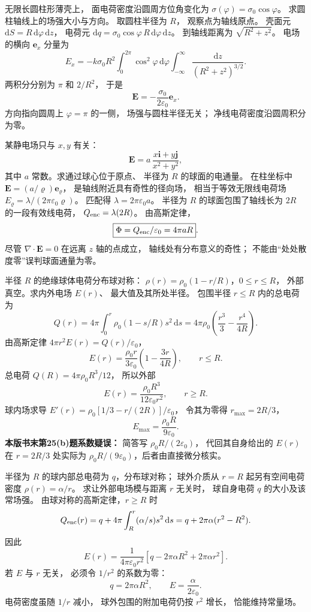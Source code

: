 无限长圆柱形薄壳上，
面电荷密度沿圆周方位角变化为
$\sigma(\varphi)=\sigma_0\cos\varphi$。
求圆柱轴线上的场强大小与方向。
\exsolution
取圆柱半径为 $R$，
观察点为轴线原点。
壳面元
$\mathrm dS=R\,\mathrm d\varphi\,\mathrm dz$，
电荷元
$\mathrm dq=\sigma_0\cos\varphi\,
R\,\mathrm d\varphi\,\mathrm dz$。
到轴线距离为
$\sqrt{R^2+z^2}$。
电场的横向 $\bm e_x$ 分量为
\[
E_x=-k\sigma_0 R^2
\int_0^{2\pi}\cos^2\varphi\,\mathrm d\varphi
\int_{-\infty}^{\infty}
\frac{\mathrm dz}{(R^2+z^2)^{3/2}}.
\]
两积分分别为 $\pi$ 和 $2/R^2$，
于是
\[
\boxed{\bm E=-\frac{\sigma_0}{2\varepsilon_0}\bm e_x}.
\]
\excheck 方向指向圆周上 $\varphi=\pi$ 的一侧，
场强与圆柱半径无关；
净线电荷密度沿圆周积分为零。

某静电场只与 $x,y$ 有关：
\[
\bm E=a\,\frac{x\bm i+y\bm j}{x^2+y^2},
\]
其中 $a$ 常数。求通过球心位于原点、
半径为 $R$ 的球面的电通量。
\exsolution
在柱坐标中
$\bm E=(a/\varrho)\bm e_\varrho$，
是轴线附近具有奇性的径向场，
相当于等效无限线电荷场
$E_\varrho=\lambda/(2\pi\varepsilon_0\varrho)$。
匹配得 $\lambda=2\pi\varepsilon_0a$。
半径为 $R$ 的球面包围了轴线长为 $2R$
的一段有效线电荷，
$Q_{\rm enc}=\lambda(2R)$。
由高斯定律，
\[
\boxed{\Phi=Q_{\rm enc}/\varepsilon_0=4\pi aR}.
\]
\excheck 尽管 $\nabla\cdot\bm E=0$
在远离 $z$ 轴的点成立，
轴线处有分布意义的奇性；
不能由“处处散度零”误判球面通量为零。

半径 $R$ 的绝缘球体电荷分布球对称：
$\rho(r)=\rho_0(1-r/R)$，$0\le r\le R$，
外部真空。求内外电场 $E(r)$、
最大值及其所处半径。
\exsolution
包围半径 $r\le R$ 内的总电荷为
\[
Q(r)=4\pi\int_0^r
\rho_0(1-s/R)s^2\,\mathrm ds
=4\pi\rho_0\left(\frac{r^3}3-\frac{r^4}{4R}\right).
\]
由高斯定律
$4\pi r^2E(r)=Q(r)/\varepsilon_0$，
\[
\boxed{E(r)=\frac{\rho_0r}{3\varepsilon_0}
\left(1-\frac{3r}{4R}\right)},\qquad r\le R.
\]
总电荷
$Q(R)=4\pi\rho_0R^3/12$，
所以外部
\[
\boxed{E(r)=\frac{\rho_0R^3}{12\varepsilon_0r^2}},
\qquad r\ge R.
\]
球内场求导
$E'(r)=\rho_0[1/3-r/(2R)]/\varepsilon_0$，
令其为零得
$r_{\max}=2R/3$，
\[
\boxed{E_{\max}=\frac{\rho_0R}{9\varepsilon_0}}.
\]
\excheck \textbf{本版书末第25(b)题系数疑误：}
简答写 $\rho_0R/(2\varepsilon_0)$，
代回其自身给出的 $E(r)$
在 $r=2R/3$ 处实际为
$\rho_0R/(9\varepsilon_0)$，后者由直接微分核实。

半径为 $R$ 的球内部总电荷为 $q$，分布球对称；
球外介质从 $r=R$ 起另有空间电荷密度
$\rho(r)=\alpha/r$。
求让外部电场模与距离 $r$ 无关时，
球自身电荷 $q$ 的大小及该常场强。
\exsolution
由球对称的高斯定律，$r\ge R$ 时
\[
Q_{\rm enc}(r)
=q+4\pi\int_R^r(\alpha/s)s^2\,\mathrm ds
=q+2\pi\alpha(r^2-R^2).
\]
因此
\[
E(r)=\frac1{4\pi\varepsilon_0r^2}
[q-2\pi\alpha R^2+2\pi\alpha r^2].
\]
若 $E$ 与 $r$ 无关，
必须令 $1/r^2$ 的系数为零：
\[
\boxed{q=2\pi\alpha R^2},\qquad
\boxed{E=\frac{\alpha}{2\varepsilon_0}}.
\]
\excheck 电荷密度虽随 $1/r$ 减小，
球外包围的附加电荷仍按 $r^2$ 增长，
恰能维持常量场。

